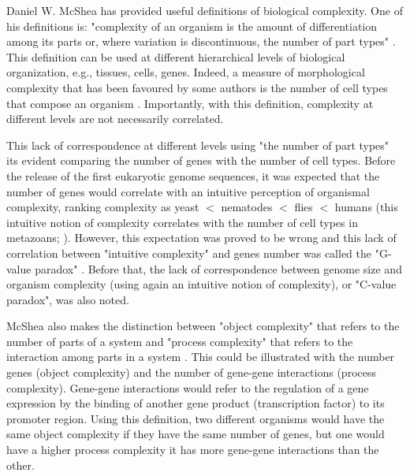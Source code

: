 Daniel W. McShea has provided useful definitions of biological complexity. One of his definitions is: "complexity of an organism is the amount of differentiation among its parts or, where variation is discontinuous, the number of part types" \citep{McShea1996,McShea2015}.
This definition can be used at different hierarchical levels of biological organization, e.g., tissues, cells, genes.
Indeed, a measure of morphological complexity that has been favoured by some authors 
is the number of cell types that compose an organism 
	\citep{Valentine1994,Bell1997,Bonner2004}.
Importantly, with this definition, complexity at different levels are not necessarily correlated.

This lack of correspondence at different levels using "the number of part types" its evident comparing the number of genes with the number of cell types. Before the release of the first eukaryotic genome sequences, it was expected that the number of genes would correlate with an intuitive perception of organismal complexity, ranking complexity as yeast $<$ nematodes $<$ flies $<$ humans \citep{Hahn2002} (this intuitive notion of complexity correlates with the number of cell types in metazoans; \citealp{Valentine1994}). However, this expectation was proved to be wrong and this lack of correlation between "intuitive complexity" and genes number was called the "G-value paradox" \citep{Hahn2002}.
Before that, the lack of correspondence between genome size and organism complexity (using again an intuitive notion of complexity),  or "C-value paradox", was also noted.


McShea also makes the distinction between "object complexity" that refers to the number of parts of a system and "process complexity" that refers to the interaction among parts in a system \citep{McShea1996}.
This could be illustrated with the number genes (object complexity) and the number of gene-gene interactions (process complexity). Gene-gene interactions would refer to the regulation of a gene expression by the binding of another gene product (transcription factor) to its promoter region.
Using this definition, two different organisms would have the same object complexity if they have the same number of genes, but one would have a higher process complexity it has more gene-gene interactions than the other.


